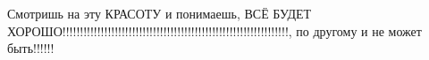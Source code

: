  
 
 
 
 

\qqSecCmt


Смотришь на эту КРАСОТУ и понимаешь, ВСЁ БУДЕТ
ХОРОШО!!!!!!!!!!!!!!!!!!!!!!!!!!!!!!!!!!!!!!!!!!!!!!!!!!!!!!!!!!!!!!!!!, по
другому и не может быть!!!!!! 
